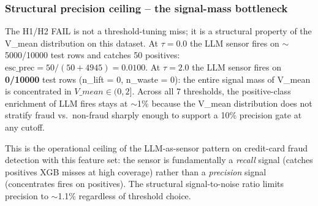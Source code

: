 \documentclass{article}
\begin{document}
\subsubsection{Structural precision ceiling -- the signal-mass bottleneck}
The H1/H2 FAIL is not a threshold-tuning miss; it is a structural
property of the V\_mean distribution on this dataset. At $\tau = 0.0$
the LLM sensor fires on $\sim$5000/10000 test rows and catches 50
positives: $\text{esc\_prec} = 50/(50 + 4945) = 0.0100$. At $\tau =
2.0$ the LLM sensor fires on \textbf{0/10000} test rows (n\_lift = 0,
n\_waste = 0): the entire signal mass of V\_mean is concentrated in
$V\_mean \in (0, 2]$. Across all 7 thresholds, the positive-class
enrichment of LLM fires stays at $\sim$1\% because the V\_mean
distribution does not stratify fraud vs.\ non-fraud sharply enough
to support a 10\% precision gate at any cutoff.

This is the operational ceiling of the LLM-as-sensor pattern on
credit-card fraud detection with this feature set: the sensor is
fundamentally a \emph{recall} signal (catches positives XGB misses at
high coverage) rather than a \emph{precision} signal (concentrates
fires on positives). The structural signal-to-noise ratio limits
precision to $\sim$1.1\% regardless of threshold choice.
\end{document}
